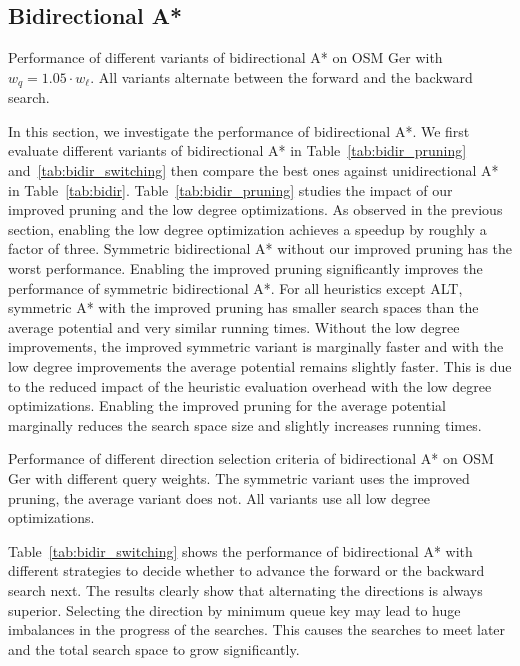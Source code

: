 \documentclass[manuscript,review]{acmart}
\begin{document}
\subsection{Bidirectional A*}

\begin{table}
\centering
\caption{
Performance of different variants of bidirectional A* on OSM Ger with $w_q = 1.05 \cdot w_\ell$.
All variants alternate between the forward and the backward search.}
\label{tab:bidir_pruning}

\end{table}

In this section, we investigate the performance of bidirectional A*.
We first evaluate different variants of bidirectional A* in Table~\ref{tab:bidir_pruning} and~\ref{tab:bidir_switching} then compare the best ones against unidirectional A* in Table~\ref{tab:bidir}.
Table~\ref{tab:bidir_pruning} studies the impact of our improved pruning and the low degree optimizations.
As observed in the previous section, enabling the low degree optimization achieves a speedup by roughly a factor of three.
Symmetric bidirectional A* without our improved pruning has the worst performance.
Enabling the improved pruning significantly improves the performance of symmetric bidirectional A*.
For all heuristics except ALT, symmetric A* with the improved pruning has smaller search spaces than the average potential and very similar running times.
Without the low degree improvements, the improved symmetric variant is marginally faster and with the low degree improvements the average potential remains slightly faster.
This is due to the reduced impact of the heuristic evaluation overhead with the low degree optimizations.
Enabling the improved pruning for the average potential marginally reduces the search space size and slightly increases running times.

\begin{table}
\centering
\caption{
Performance of different direction selection criteria of bidirectional A* on OSM Ger with different query weights.
The symmetric variant uses the improved pruning, the average variant does not.
All variants use all low degree optimizations.
}\label{tab:bidir_switching}

\end{table}

Table~\ref{tab:bidir_switching} shows the performance of bidirectional A* with different strategies to decide whether to advance the forward or the backward search next.
The results clearly show that alternating the directions is always superior.
Selecting the direction by minimum queue key may lead to huge imbalances in the progress of the searches.
This causes the searches to meet later and the total search space to grow significantly.
\end{document}
